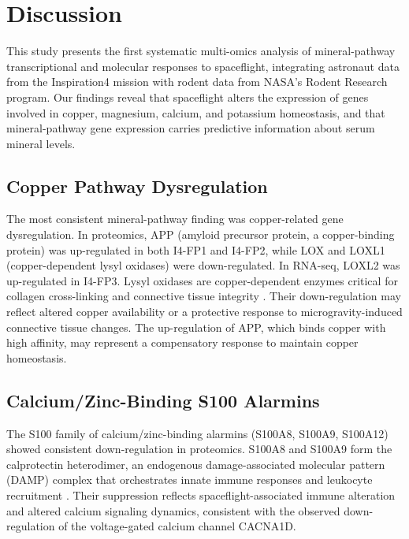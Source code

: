 \documentclass[11pt,a4paper]{article}
\begin{document}
\section{Discussion}

This study presents the first systematic multi-omics analysis of mineral-pathway transcriptional and molecular responses to spaceflight, integrating astronaut data from the Inspiration4 mission with rodent data from NASA's Rodent Research program. Our findings reveal that spaceflight alters the expression of genes involved in copper, magnesium, calcium, and potassium homeostasis, and that mineral-pathway gene expression carries predictive information about serum mineral levels.

\subsection{Copper Pathway Dysregulation}

The most consistent mineral-pathway finding was copper-related gene dysregulation. In proteomics, APP (amyloid precursor protein, a copper-binding protein) was up-regulated in both I4-FP1 and I4-FP2, while LOX and LOXL1 (copper-dependent lysyl oxidases) were down-regulated. In RNA-seq, LOXL2 was up-regulated in I4-FP3. Lysyl oxidases are copper-dependent enzymes critical for collagen cross-linking and connective tissue integrity \citep{kagan2003}. Their down-regulation may reflect altered copper availability or a protective response to microgravity-induced connective tissue changes. The up-regulation of APP, which binds copper with high affinity, may represent a compensatory response to maintain copper homeostasis.

\subsection{Calcium/Zinc-Binding S100 Alarmins}

The S100 family of calcium/zinc-binding alarmins (S100A8, S100A9, S100A12) showed consistent down-regulation in proteomics. S100A8 and S100A9 form the calprotectin heterodimer, an endogenous damage-associated molecular pattern (DAMP) complex that orchestrates innate immune responses and leukocyte recruitment \citep{pruenster2016}. Their suppression reflects spaceflight-associated immune alteration and altered calcium signaling dynamics, consistent with the observed down-regulation of the voltage-gated calcium channel CACNA1D.
\end{document}
